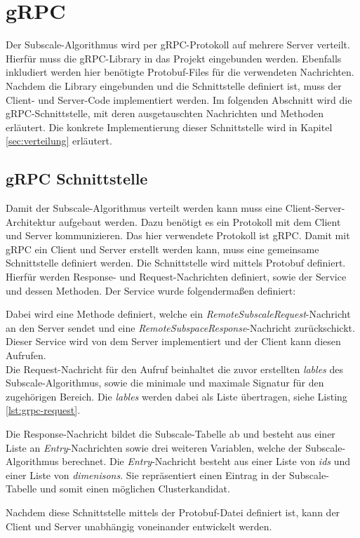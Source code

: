 \section{gRPC}
Der Subscale-Algorithmus wird per gRPC-Protokoll auf mehrere Server verteilt. Hierfür muss die gRPC-Library in das
Projekt eingebunden werden. Ebenfalls inkludiert werden hier benötigte Protobuf-Files für die verwendeten Nachrichten.
Nachdem die Library eingebunden und die Schnittstelle definiert ist, muss der Client- und Server-Code implementiert
werden. Im folgenden Abschnitt wird die gRPC-Schnittstelle, mit deren ausgetauschten Nachrichten und Methoden erläutert.
Die konkrete Implementierung dieser Schnittstelle wird in Kapitel \ref{sec:verteilung} erläutert.

\subsection{gRPC Schnittstelle}
\label{sec:grpc}
Damit der Subscale-Algorithmus verteilt werden kann muss eine Client-Server-Architektur aufgebaut werden. Dazu benötigt
es ein Protokoll mit dem Client und Server kommunizieren. Das hier verwendete Protokoll ist gRPC. Damit mit gRPC ein
Client und Server erstellt werden kann, muss eine gemeinsame Schnittstelle definiert werden. Die Schnittstelle wird
mittels Protobuf definiert. Hierfür werden Response- und Request-Nachrichten definiert, sowie der Service und dessen
Methoden. Der Service wurde folgendermaßen definiert:

Dabei wird eine Methode definiert, welche ein \textit{RemoteSubscaleRequest}-Nachricht an den Server sendet und eine
\textit{RemoteSubspaceResponse}-Nachricht zurückschickt. Dieser Service wird von dem Server implementiert und der Client
kann diesen Aufrufen.
\\
Die Request-Nachricht für den Aufruf beinhaltet die zuvor erstellten \textit{lables} des Subscale-Algorithmus, sowie die
minimale und maximale Signatur für den zugehörigen Bereich. Die \textit{lables} werden dabei als Liste übertragen, siehe
Listing \ref{lst:grpc-request}.


Die Response-Nachricht bildet die Subscale-Tabelle ab und besteht aus einer Liste an \textit{Entry}-Nachrichten sowie
drei weiteren Variablen, welche der Subscale-Algorithmus berechnet. Die \textit{Entry}-Nachricht besteht aus einer Liste
von \textit{ids} und einer Liste von \textit{dimenisons}. Sie repräsentiert einen Eintrag in der Subscale-Tabelle und
somit einen möglichen Clusterkandidat.

Nachdem diese Schnittstelle mittels der Protobuf-Datei definiert ist, kann der Client und Server unabhängig voneinander
entwickelt werden.

